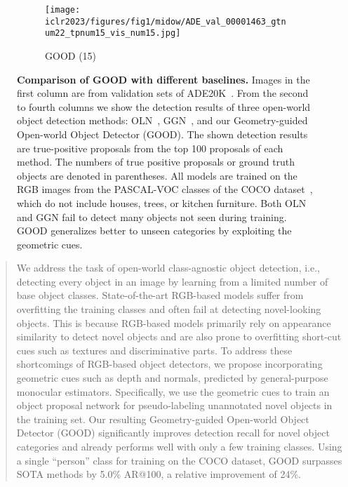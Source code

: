 \documentclass{article} \usepackage{iclr2023_conference,times}
\begin{document}
\begin{figure}[h]
\begin{subfigure}[b]{0.244\textwidth}
         \label{fig:five over x}
     \end{subfigure} 
     \begin{subfigure}[b]{0.244\textwidth}
         \centering
         \texttt{[image: iclr2023/figures/fig1/midow/ADE\_val\_00001463\_gtnum22\_tpnum15\_vis\_num15.jpg]}
         \caption{GOOD (15)}
         \label{fig:five over x}
     \end{subfigure} 
        \caption{\textbf{Comparison of GOOD with different baselines.} Images in the first column are from validation sets of ADE20K~\citep{zhou2019semantic}. From the second to fourth columns we show the detection results of three open-world object detection methods: OLN~\cite{kim_learning_2021}, GGN~\cite{wang2022open}, and our Geometry-guided Open-world Object Detector (GOOD). The shown detection results are true-positive proposals from the top 100 proposals of each method. The numbers of true positive proposals or ground truth objects are denoted in parentheses. All models are trained on the RGB images from the PASCAL-VOC classes of the COCO dataset~\citep{CoCodataset}, which do not include houses, trees, or kitchen furniture. Both OLN and GGN fail to detect many objects not seen during training. GOOD generalizes better to unseen categories by exploiting the geometric cues.}\label{fig:detection-vis}
\end{figure}

\begin{abstract}

We address the task of open-world class-agnostic object detection, i.e., detecting every object in an image by learning from a limited number of base object classes. State-of-the-art RGB-based models suffer from overfitting the training classes and often fail at detecting novel-looking objects. This is because RGB-based models primarily rely on appearance similarity to detect novel objects and are also prone to overfitting short-cut cues such as textures and discriminative parts. 
To address these shortcomings of RGB-based object detectors, we propose incorporating geometric cues such as depth and normals, predicted by  general-purpose monocular estimators.
Specifically, we use the geometric cues to train an object proposal network for pseudo-labeling unannotated novel objects in the training set. 
Our resulting Geometry-guided Open-world Object Detector (GOOD) significantly improves detection recall for novel object categories and already performs well with only a few training classes.
Using a single ``person'' class for training on the COCO dataset, GOOD  surpasses SOTA methods by 5.0\% AR@100, a relative improvement of 24\%.

\end{abstract}
\end{document}

